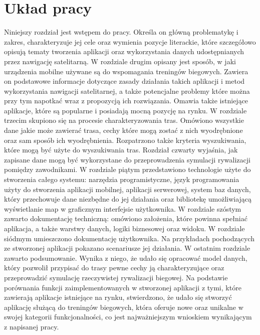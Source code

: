 \section{Układ pracy}
Niniejszy rozdział jest wstępem do pracy. Określa on główną problematykę i zakres, charakteryzuje jej cele oraz wymienia pozycje literackie, które szczegółowo opisują tematy tworzenia aplikacji oraz wykorzystania danych udostępnianych przez nawigację satelitarną. W rozdziale drugim opisany jest sposób, w jaki urządzenia mobilne używane są do wspomagania treningów biegowych. Zawiera on podstawowe informacje dotyczące zasady działania takich aplikacji i metod wykorzystania nawigacji satelitarnej, a także potencjalne problemy które można przy tym napotkać wraz z propozycją ich rozwiązania. Omawia także istniejące aplikacje, które są popularne i posiadają mocną pozycję na rynku. W rozdziale trzecim skupiono się na procesie charakteryzowania tras. Omówiono wszystkie dane jakie może zawierać trasa, cechy które mogą zostać z nich wyodrębnione oraz sam sposób ich wyodrębnienia. Rozpatrzono także kryteria wyszukiwania, które mogą być użyte do wyszukiwania tras. Rozdział czwarty wyjaśnia, jak zapisane dane mogą być wykorzystane do przeprowadzenia symulacji rywalizacji pomiędzy zawodnikami. W rozdziale piątym przedstawiono technologie użyte do stworzenia całego systemu: narzędzia programistyczne, język programowania użyty do stworzenia aplikacji mobilnej, aplikacji serwerowej, system baz danych, który przechowuje dane niezbędne do jej działania oraz bibliotekę umożliwiającą wyświetlanie map w graficznym interfejsie użytkownika. W rozdziale szóstym zawarto dokumentację techniczną: omówiono założenia, które powinna spełniać aplikacja, a także warstwy danych, logiki biznesowej oraz widoku. W rozdziale siódmym umieszczono dokumentację użytkownika. Na przykładach pochodzących ze stworzonej aplikacji pokazano scenariusze jej działania. W ostatnim rozdziale zawarto podsumowanie. Wynika z niego, że udało się opracować model danych, który pozwolił przypisać do trasy pewne cechy ją charakteryzujące oraz przeprowadzić symulację rzeczywistej rywalizacji biegowej. Na podstawie porównania funkcji zaimplementowanych w stworzonej aplikacji z tymi, które zawierają aplikacje istniejące na rynku, stwierdzono, że udało się stworzyć aplikację służącą do treningów biegowych, która oferuje nowe oraz unikalne w swojej kategorii funkcjonalności, co jest najważniejszym wnioskiem wynikającym z napisanej pracy.